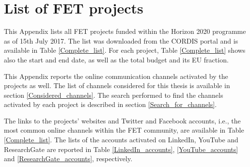 \chapter{List of FET projects} \label{List_of_FET_projects}
This Appendix lists all FET projects funded within the Horizon 2020 programme as of 15th July 2017. The list was downloaded from the CORDIS portal \cite{CORDIS} and is available in Table \ref{Complete_list}. For each project, Table \ref{Complete_list} shows also the start and end date, as well as the total budget and its EU fraction.  

This Appendix reports the online communication channels activated by the projects as well. The list of channels considered for this thesis is available in section \ref{Considered_channels}. The search performed to find the channels activated by each project is described in section \ref{Search_for_channels}.

The links to the projects' websites and Twitter and Facebook  accounts, i.e., the most common online channels within the FET community, are available in Table \ref{Complete_list}. The lists of the accounts activated on LinkedIn, YouTube and ResearchGate are reported in Table \ref{LinkedIn_accounts}, \ref{YouTube_accounts} and \ref{ResearchGate_accounts}, respectively.

